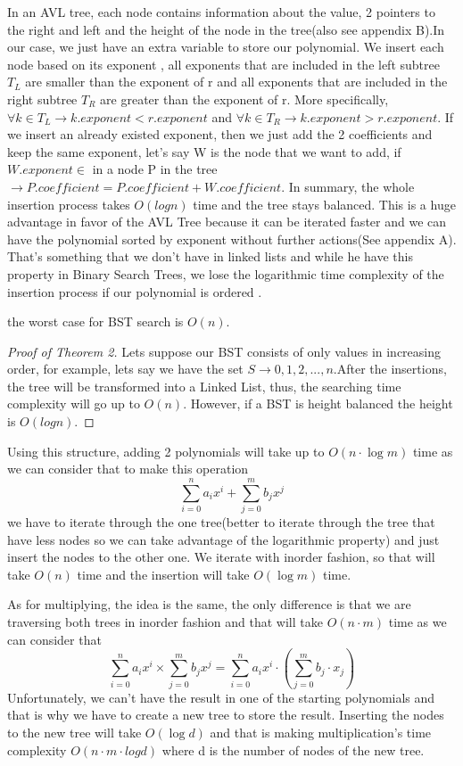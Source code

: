 \documentclass[journal,article,submit,moreauthors,algorithms]{Definitions/mdpi}
\begin{document}
In an AVL tree, each node contains information about the value, 2 pointers to the right and left and the height of the node in the tree\cite{FPO}(also see appendix B).In our case, we just have an extra variable to store our polynomial. We insert each node based on its exponent , all exponents that are included in the left subtree $T_L$ are smaller than the exponent of r and all exponents that are included in the right subtree $T_R$ are greater than the exponent of r. More specifically, $ \forall k \in T_L \rightarrow k.exponent < r.exponent $ and  $\forall k \in T_R \rightarrow k.exponent > r.exponent$. If we insert an already existed exponent, then we just add the 2 coefficients and keep the same exponent, let’s say W is the node that we want to add, if $W.exponent \in $ in a node P in the tree  $\rightarrow P.coefficient = P.coefficient + W.coefficient. $
\medbreak
In summary, the whole insertion process takes $O(logn)$ time and the tree stays balanced. This is a huge advantage in favor of the AVL Tree because it can be iterated faster and we can have the polynomial sorted by exponent without further actions(See appendix A). That’s something that we don’t have in linked lists and while he have this property in Binary Search Trees, we lose the logarithmic time complexity of the insertion process if our polynomial is ordered \cite{BST analysis}.
\begin{Theorem}
the worst case for BST search is $O(n)$.
\end{Theorem}

\begin{proof}[Proof of Theorem 2]
Lets suppose our BST consists of only values in increasing order, for example, lets say we have the set $S \rightarrow {0,1,2,...,n}$.After the insertions, the tree will be transformed into a Linked List, thus, the searching time complexity will go up to $O(n)$. However, if a BST is height balanced the height is $O(logn)$.
\end{proof}



\medbreak
Using this structure, adding 2 polynomials will take up to $O(n\cdot \log m)$ time as we can consider that to make this operation \[\sum_{i=0}^{n} a_ix^i + \sum_{j = 0}^{m} b_jx^j\] we have to iterate through the one tree(better to iterate through the tree that have less nodes so we can take advantage of the logarithmic property) and just insert the nodes to the other one. We iterate with inorder fashion, so that will take $O(n)$ time and the insertion will take $O(\log m)$ time.

\medbreak
As for multiplying, the idea is the same, the only difference is that we are traversing both trees in inorder fashion and that will take $O(n \cdot m)$ time as we can consider that \[\sum_{i=0}^{n} a_ix^i \times \sum_{j = 0}^{m} b_jx^j = \sum_{i = 0}^{n}a_ix^i \cdot (\sum_{j = 0}^{m}b_j \cdot x_j)\] Unfortunately, we can't have the result in one of the starting polynomials and that is why we have to create a new tree to store the result. Inserting the nodes to the new tree will take $O(\log d)$ and that is making multiplication's time complexity $O(n \cdot m \cdot logd)$ where d is the number of nodes of the new tree.

\end{document}
